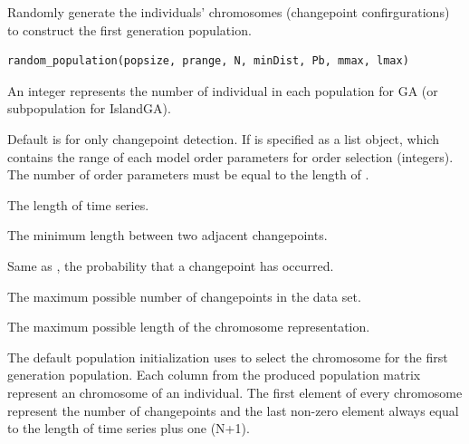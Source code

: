 \documentclass[a4paper]{book}
\begin{document}
%
\begin{Description}
Randomly generate the individuals' chromosomes (changepoint confirgurations)
to construct the first generation population.
\end{Description}
%
\begin{Usage}
\begin{verbatim}
random_population(popsize, prange, N, minDist, Pb, mmax, lmax)
\end{verbatim}
\end{Usage}
%
\begin{Arguments}
\begin{ldescription}
\item[\code{popsize}] An integer represents the number of individual in each
population for GA (or subpopulation for IslandGA).

\item[\code{prange}] Default is  for only changepoint detection. If
 is specified as a list object, which contains the range of
each model order parameters for order selection (integers). The number of
order parameters must be equal to the length of .

\item[\code{N}] The length of time series.

\item[\code{minDist}] The minimum length between two adjacent changepoints.

\item[\code{Pb}] Same as , the probability that a changepoint has occurred.

\item[\code{mmax}] The maximum possible number of changepoints in the data set.

\item[\code{lmax}] The maximum possible length of the chromosome representation.
\end{ldescription}
\end{Arguments}
%
\begin{Details}
The default population initialization uses  to
select the chromosome for the first generation population. Each column from
the produced population matrix represent an chromosome of an individual.
The first element of every chromosome represent the number of changepoints
and the last non-zero element always equal to the length of time series
plus one (N+1).
\end{Details}
\end{document}
